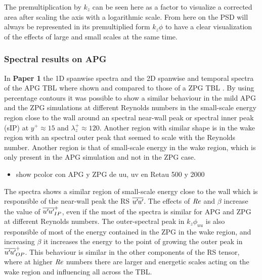 The premultiplication by $k_z$ can be seen here as a factor to visualize a corrected area after scaling the axis with a logarithmic scale.
From here on the PSD will always be represented in its premultiplied form $k_z\phi$ to have a clear visualization of the effects of large and small scales at the same time.

\subsubsection{Spectral results on APG}

In \textbf{Paper 1} the 1D spanwise spectra and the 2D spanwise and temporal spectra of the APG TBL where shown and compared to those of a ZPG TBL \citep{EAmorZPG}. By using percentage contours it was possible to show a similar behaviour in the mild APG and the ZPG simulations at different Reynolds numbers in the small-scale energy region close to the wall around an spectral near-wall peak or spectral inner peak (sIP) at $y^+\approx 15$ and $\lambda_z^+\approx 120$. Another region with similar shape is in the wake region with an spectral outer peak that seemed to scale with the Reynolds number.
Another region is that of small-scale energy in the wake region, which is only present in the APG simulation and not in the ZPG case.

\begin{itemize}
    \item show pcolor con APG y ZPG de uu, uv en Retau 500 y 2000
\end{itemize}

The spectra shows a similar region of small-scale energy close to the wall which is responsible of the near-wall peak the RS $\overline{u^{\prime}\mkern-1.2mu u^{\prime}\mkern-1.2mu}$. The effects of $\mbox{\textit{Re}}$ and $\beta$ increase the value of $\overline{u^{\prime}\mkern-1.2mu u^{\prime}\mkern-1.2mu}_{IP}^+$, even if the most of the spectra is similar for APG and ZPG at different Reynolds numbers.
The outer-spectral peak in $k_z\phi_{uu}$ is also responsible of most of the energy contained in the ZPG in the wake region, and increasing $\beta$ it increases the energy to the point of growing the outer peak in $\overline{u^{\prime}\mkern-1.2mu u^{\prime}\mkern-1.2mu}_{OP}^+$. This behaviour is similar in the other components of the RS tensor, where at higher $\mbox{\textit{Re}}$ numbers there are larger and energetic scales acting on the wake region and influencing all across the TBL.

